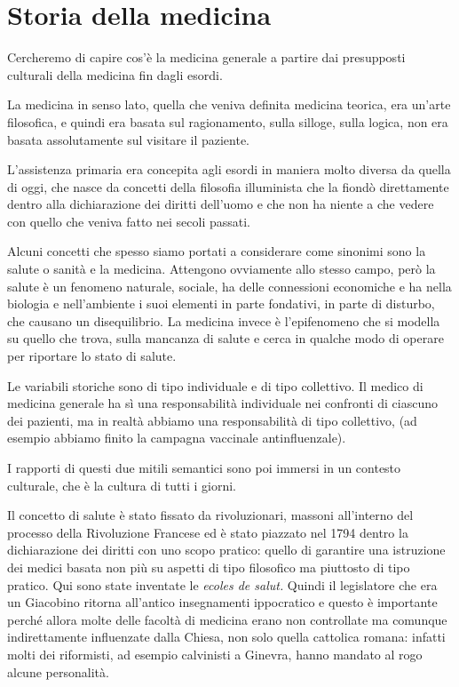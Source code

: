 \section{Storia della medicina}

Cercheremo di capire cos'è la medicina generale a partire dai
presupposti culturali della medicina fin dagli esordi.

La medicina in senso lato, quella che veniva definita medicina teorica,
era un'arte filosofica, e quindi era basata sul ragionamento, sulla
silloge, sulla logica, non era basata assolutamente sul visitare il
paziente.

L'assistenza primaria era concepita agli esordi in maniera molto diversa
da quella di oggi, che nasce da concetti della filosofia illuminista che
la fiondò direttamente dentro alla dichiarazione dei diritti dell'uomo e
che non ha niente a che vedere con quello che veniva fatto nei secoli
passati.

Alcuni concetti che spesso siamo portati a considerare come sinonimi
sono la salute o sanità e la medicina. Attengono ovviamente allo stesso
campo, però la salute è un fenomeno naturale, sociale, ha delle
connessioni economiche e ha nella biologia e nell'ambiente i suoi
elementi in parte fondativi, in parte di disturbo, che causano un
disequilibrio. La medicina invece è l'epifenomeno che si modella su
quello che trova, sulla mancanza di salute e cerca in qualche modo di
operare per riportare lo stato di salute.

Le variabili storiche sono di tipo individuale e di tipo collettivo. Il
medico di medicina generale ha sì una responsabilità individuale nei
confronti di ciascuno dei pazienti, ma in realtà abbiamo una
responsabilità di tipo collettivo, (ad esempio abbiamo finito la
campagna vaccinale antinfluenzale).

I rapporti di questi due mitili semantici sono poi immersi in un
contesto culturale, che è la cultura di tutti i giorni.

Il concetto di salute è stato fissato da rivoluzionari, massoni
all'interno del processo della Rivoluzione Francese ed è stato piazzato
nel 1794 dentro la dichiarazione dei diritti con uno scopo pratico:
quello di garantire una istruzione dei medici basata non più su aspetti
di tipo filosofico ma piuttosto di tipo pratico. Qui sono state
inventate le \emph{ecoles de salut.} Quindi il legislatore che era un
Giacobino ritorna all'antico insegnamenti ippocratico e questo è
importante perché allora molte delle facoltà di medicina erano non
controllate ma comunque indirettamente influenzate dalla Chiesa, non
solo quella cattolica romana: infatti molti dei riformisti, ad esempio
calvinisti a Ginevra, hanno mandato al rogo alcune personalità.

